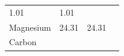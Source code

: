 \begin{enumerate}[noitemsep, label=\textbf{\arabic*}. ]
{{\begin{center}
\begin{tabular}[t]{|l|l|l|l|}
    
        1.01 &
    
    
        1.01 &
    
    
     \tabularnewline\cline{1-1}\cline{2-2}\cline{3-3}\cline{4-4}
    
    
        Magnesium &
    
    
        24.31 &
    
    
        24.31 &
    
    
     \tabularnewline\cline{1-1}\cline{2-2}\cline{3-3}\cline{4-4}
    
    
        Carbon &
    

\end{tabular}
\end{center}}}
\end{enumerate}
